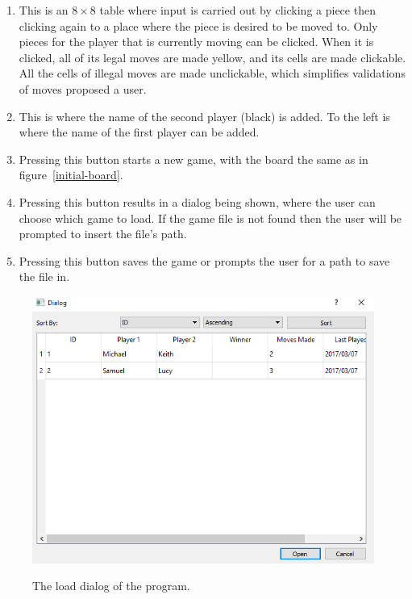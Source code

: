 \begin{enumerate}[label=(\Alph*)]
	\item This is an $ 8\times8 $ table where input is carried out by clicking a piece then clicking again to a place where the piece is desired to be moved to. Only pieces for the player that is currently moving can be clicked. When it is clicked, all of its legal moves are made yellow, and its cells are made clickable. All the cells of illegal moves are made unclickable, which simplifies validations of moves proposed a user.
	\item This is where the name of the second player (black) is added. To the left is where the name of the first player can be added.
	\item Pressing this button starts a new game, with the board the same as in figure~\ref{initial-board}.
	\item Pressing this button results in a dialog being shown, where the user can choose which game to load. If the game file is not found then the user will be prompted to insert the file's path.
	\item Pressing this button saves the game or prompts the user for a path to save the file in.
\end{enumerate}
\begin{figure}[H]
	\centering
	\begin{annotatedFigure}
		{\includegraphics[width=1.0\textwidth]{images/screenshots/load-dialog}}
	\end{annotatedFigure}
	\caption{The load dialog of the program.}
\end{figure}
